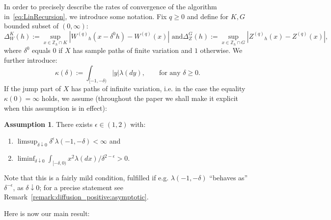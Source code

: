\documentclass[pdftex,oneside,11pt,reqno]{amsart}
\theoremstyle{definition}
\theoremstyle{theorem}
\newtheorem{assumption}{Assumption}[section]
\theoremstyle{remark}
\numberwithin{equation}{section}
\numberwithin{definition}{section}
\begin{document}
In order to precisely describe the rates of convergence of the 
algorithm in~\eqref{eq:LinRecursion}, we introduce some notation. Fix $q\geq 0$ and define for $K,G$ bounded
subset of $(0,\infty)$: 
$$\Delta_W^K(h):=\sup_{x\in {\mathbb{Z}_h}\cap
K}\left\vert {W^{(q)}}_h(x-\delta^0h)-{W^{(q)}}(x)\right\vert\text{ and
}\Delta_Z^G(h):=\sup_{x\in {\mathbb{Z}_h}\cap G}\left\vert {Z^{(q)}}_h(x)-{Z^{(q)}}(x)\right\vert,$$
where $\delta^0$ equals $0$ 
if
$X$ has sample paths of finite
variation and
$1$ otherwise. 
We further introduce: 
$$\kappa(\delta):=\int_{[-1,-\delta)}\vert y\vert{\lambda}(dy),\qquad\text{for any $\delta\geq 0$.}$$ 
If the jump part of 
$X$
has paths of infinite variation, 
i.e. in the case the equality $\kappa(0)=\infty$ holds, 
we assume
(throughout the paper we shall make it explicit when this assumption is in effect): 
\begin{assumption}\label{assumption:salient}
There exists $\epsilon\in (1,2)$ with:
\begin{enumerate}[(1)]
\item\label{assumption:salient:one}  $\limsup_{\delta\downarrow 0}\delta^{\epsilon}{\lambda}(-1,-\delta)<\infty$ and
\item\label{assumption:salient:two} $\liminf_{\delta\downarrow 0}\int_{[-\delta,0)}x^2{\lambda}(dx)/\delta^{2-\epsilon}>0$. 
\end{enumerate}
\end{assumption}
Note that this is a fairly mild condition, fulfilled if e.g. ${\lambda}(-1,-\delta)$ ``behaves as'' $\delta^{-\epsilon}$, as $\delta\downarrow 0$; for a precise statement see Remark~\ref{remark:diffusion_positive:asymptotic}. 

Here is now our main result:
\end{document}
